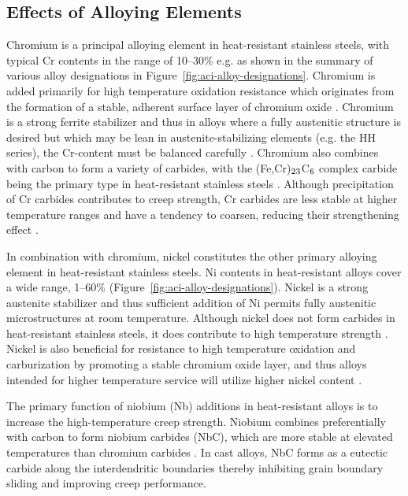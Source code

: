\subsection{Effects of Alloying Elements}
Chromium is a principal alloying element in heat-resistant stainless steels, with typical Cr contents in the range of \numrange[range-phrase=--]{10}{30}\% e.g. as shown in the summary of various alloy designations in Figure~\ref{fig:aci-alloy-designations}. Chromium is added primarily for high temperature oxidation resistance which originates from the formation of a stable, adherent surface layer of chromium oxide \cite{kane_evolution_1991}. Chromium is a strong ferrite stabilizer \cite{folkhard_welding_1988} and thus in alloys where a fully austenitic structure is desired but which may be lean in austenite-stabilizing elements (e.g. the HH series), the Cr-content must be balanced carefully \cite{avery_cast_1969}. Chromium also combines with carbon to form a variety of carbides, with the (Fe,Cr)$_\textnormal{23}$C$_\textnormal{6}$ complex carbide being the primary type in heat-resistant stainless steels \cite{sourmail_precipitation_2001}. Although precipitation of Cr carbides contributes to creep strength, Cr carbides are less stable at higher temperature ranges and have a tendency to coarsen, reducing their strengthening effect \cite{avery_cast_1969}.

In combination with chromium, nickel constitutes the other primary alloying element in heat-resistant stainless steels. Ni contents in heat-resistant alloys cover a wide range, \numrange[range-phrase=--]{1}{60}\% (Figure~\ref{fig:aci-alloy-designations}). Nickel is a strong austenite stabilizer \cite{folkhard_welding_1988} and thus sufficient addition of Ni permits fully austenitic microstructures at room temperature. Although nickel does not form carbides in heat-resistant stainless steels, it does contribute to high temperature strength \cite{kane_evolution_1991}. Nickel is also beneficial for resistance to high temperature oxidation and carburization by promoting a stable chromium oxide layer, and thus alloys intended for higher temperature service will utilize higher nickel content \cite{kane_evolution_1991}.

The primary function of niobium (Nb) additions in heat-resistant alloys is to increase the high-temperature creep strength. Niobium combines preferentially with carbon to form niobium carbides (NbC), which are more stable at elevated temperatures than chromium carbides \cite{keown_niobium_1981}. In cast alloys, NbC forms as a eutectic carbide along the interdendritic boundaries \cite{davis_metallurgy_1994} thereby inhibiting grain boundary sliding and improving creep performance.

